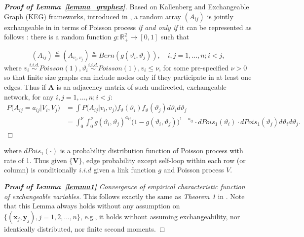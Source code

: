 \documentclass[12pt]{article}
\theoremstyle{definition}
\begin{document}
\begin{proof}[\textbf{Proof of Lemma~\ref{lemma_graphex}}]
	Based on Kallenberg and Exchangeable Graph (KEG) frameworks, introduced in \cite{veitch2015class}, a random array $(A_{ij})$ is jointly exchangeable in in terms of Poisson process \textit{if and only if} it can be represented as follows : there is a random function $g : \mathbb{R}^{2}_{+} \rightarrow [0,1]$ such that 
	
	\begin{equation}
	(A_{ij})  \stackrel{d}{=} (A_{v_{i}, v_{j}} )  \stackrel{d}{=} Bern( g( \vartheta_{i}, \vartheta_{j})), \quad i,j=1,\ldots,n ; i < j,
	\end{equation}
	where $v_{i} \overset{i.i.d.}{\sim} Poisson(1), \vartheta_{i} \overset{i.i.d.}{\sim} Poisson(1), v_{i} \leq \nu$, for some pre-specified $\nu >0$ so that finite size graphs can include nodes only if they participate in at least one edges. Thus if $\mathbf{A}$ is an adjacency matrix of such undirected, exchangeable network, for any $i,j = 1,... , n; i < j$:
\begin{equation}
\begin{split}
	P \big(  A_{ij} = a_{ij} \big| V_{i}, V_{j} \big) & = \int P \big( A_{ij} \big| v_{i}, v_{j} \big) f_{\vartheta} ( \vartheta_{i}) f_{\vartheta}(\vartheta_{j})   d\vartheta_{i} d\vartheta_{j}   \\ & = \int_{0}^{\nu} \int_{0}^{\nu}   g( \vartheta_{i},  \vartheta_{j})^{a_{ij}} \big( 1- g( \vartheta_{i},  \vartheta_{j}) \big)^{1-a_{ij}}  \cdot dPois_{1}(\vartheta_{i}) \cdot dPois_{1}(\vartheta_{j})  d \vartheta_{i} d \vartheta_{j}.
\end{split}
\end{equation}
\end{proof}
where $dPois_{1}(\cdot)$ is a probability distribution function of Poisson process with rate of 1.  Thus given $\{ \mathbf{V} \}$, edge probability except self-loop within each row (or column) is conditionally $\textit{i.i.d}$ given a link function $g$ and Poisson process $V$.



\begin{proof}[\textbf{Proof of Lemma~\ref{lemma1}} Convergence of empirical characteristic function of exchangeable variables] 
	
This follows exactly the same as \textit{Theorem 1} in \cite{szekely2007measuring}. Note that this Lemma always holds without any assumption on $\{(\mathbf{x}_{j},\mathbf{y}_{j}), j=1,2,...,n\}$, e.g., it holds without assuming exchangeability, nor identically distributed, nor finite second moments.
\end{proof}
\end{document}
